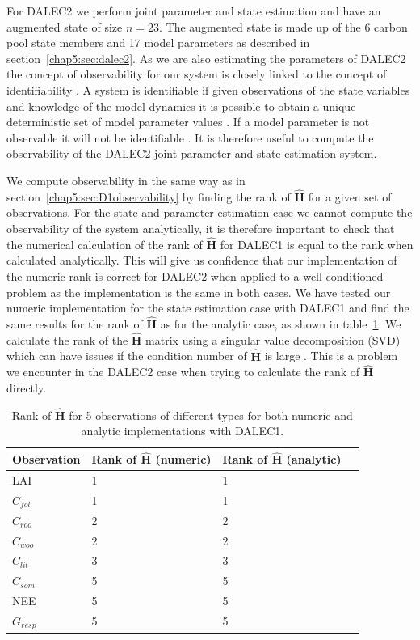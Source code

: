 For DALEC2 we perform joint parameter and state estimation and have an augmented state of size $n = 23$. The augmented state is made up of the 6 carbon pool state members and 17 model parameters as described in section~\ref{chap5:sec:dalec2}. As we are also estimating the parameters of DALEC2 the concept of observability for our system is closely linked to the concept of identifiability \citep{navon1998practical}. A system is identifiable if given observations of the state variables and knowledge of the model dynamics it is possible to obtain a unique deterministic set of model parameter values \citep{ljung1998system}. If a model parameter is not observable it will not be identifiable \citep{Jacquez1985}. It is therefore useful to compute the observability of the DALEC2 joint parameter and state estimation system.

We compute observability in the same way as in section~\ref{chap5:sec:D1observability} by finding the rank of $\hat{\textbf{H}}$ for a given set of observations. For the state and parameter estimation case we cannot compute the observability of the system analytically, it is therefore important to check that the numerical calculation of the rank of $\hat{\textbf{H}}$ for DALEC1 is equal to the rank when calculated analytically. This will give us confidence that our implementation of the numeric rank is correct for DALEC2 when applied to a well-conditioned problem as the implementation is the same in both cases. We have tested our numeric implementation for the state estimation case with DALEC1 and find the same results for the rank of $\hat{\textbf{H}}$ as for the analytic case, as shown in table~\ref{chap5:table: a_n_h_D1}. We calculate the rank of the $\hat{\textbf{H}}$ matrix using a singular value decomposition (SVD) which can have issues if the condition number of $\hat{\textbf{H}}$ is large \citep{Paige1981}. This is a problem we encounter in the DALEC2 case when trying to calculate the rank of $\hat{\textbf{H}}$ directly.  

\begin{table}[ht] 
\begin{center}
	\begin{tabular}{| l | l | l | l}
	\hline
	Observation & Rank of $\hat{\textbf{H}}$ (numeric) & Rank of $\hat{\textbf{H}}$ (analytic) \\ \hline
	LAI & 1 & 1 \\ \hline
	$C_{fol}$ & 1 & 1  \\ \hline
	$C_{roo}$ & 2 & 2 \\ \hline
	$C_{woo}$ & 2 & 2 \\ \hline
	$C_{lit}$ & 3 & 3 \\ \hline
	$C_{som}$ & 5 & 5 \\ \hline
	NEE & 5 & 5 \\ \hline
	$G_{resp}$ & 5 & 5 \\  
	\hline
	\end{tabular}
	\caption{Rank of $\hat{\textbf{H}}$ for 5 observations of different types for both numeric and analytic implementations with DALEC1.}
	\label{chap5:table: a_n_h_D1}
\end{center} 
\end{table}



